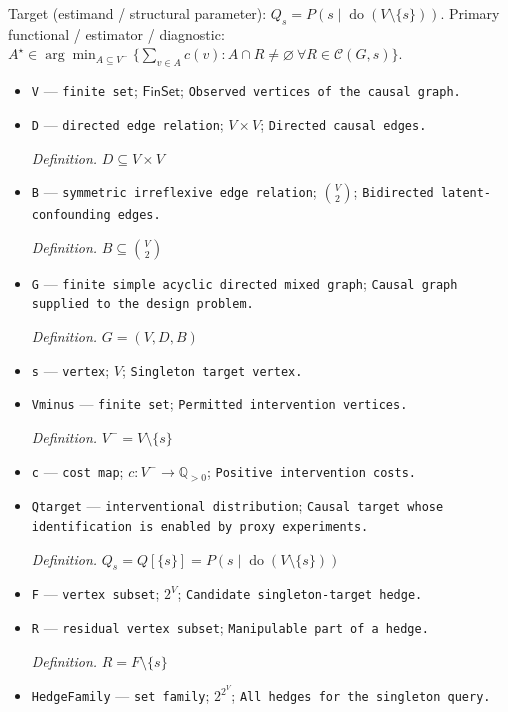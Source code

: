 \documentclass{article}
\begin{document}
Target (estimand / structural parameter): \(Q_s=P(s\mid\operatorname{do}(V\setminus\{s\}))\).
Primary functional / estimator / diagnostic: \(A^\star\in\arg\min_{A\subseteq V^{-}}\{\sum_{v\in A}c(v):A\cap R\neq\varnothing\ \forall R\in\mathcal C(G,s)\}\).
\begin{itemize}
  \item \texttt{V} --- \texttt{finite set}; \(\mathsf{FinSet}\); \texttt{Observed vertices of the causal graph.}
  \item \texttt{D} --- \texttt{directed edge relation}; \(V\times V\); \texttt{Directed causal edges.}
  \par\smallskip\noindent\emph{Definition.} \(D\subseteq V\times V\)
  \item \texttt{B} --- \texttt{symmetric irreflexive edge relation}; \(\binom{V}{2}\); \texttt{Bidirected latent-\allowbreak{}confounding edges.}
  \par\smallskip\noindent\emph{Definition.} \(B\subseteq \binom{V}{2}\)
  \item \texttt{G} --- \texttt{finite simple acyclic directed mixed graph}; \texttt{Causal graph supplied to the design problem.}
  \par\smallskip\noindent\emph{Definition.} \(G=(V,D,B)\)
  \item \texttt{s} --- \texttt{vertex}; \(V\); \texttt{Singleton target vertex.}
  \item \texttt{Vminus} --- \texttt{finite set}; \texttt{Permitted intervention vertices.}
  \par\smallskip\noindent\emph{Definition.} \(V^{-}=V\setminus\{s\}\)
  \item \texttt{c} --- \texttt{cost map}; \(c:V^{-}\to\mathbb Q_{>0}\); \texttt{Positive intervention costs.}
  \item \texttt{Qtarget} --- \texttt{interventional distribution}; \texttt{Causal target whose identification is enabled by proxy experiments.}
  \par\smallskip\noindent\emph{Definition.} \(Q_s=Q[\{s\}]=P(s\mid\operatorname{do}(V\setminus\{s\}))\)
  \item \texttt{F} --- \texttt{vertex subset}; \(2^V\); \texttt{Candidate singleton-\allowbreak{}target hedge.}
  \item \texttt{R} --- \texttt{residual vertex subset}; \texttt{Manipulable part of a hedge.}
  \par\smallskip\noindent\emph{Definition.} \(R=F\setminus\{s\}\)
  \item \texttt{HedgeFamily} --- \texttt{set family}; \(2^{2^V}\); \texttt{All hedges for the singleton query.}

\end{itemize}
\end{document}
